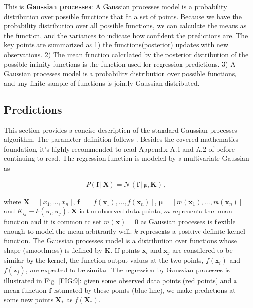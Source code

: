 \documentclass[12pt,letterpaper,fleqn,oneside,titlepage]{offroad-report}
\begin{document}
This is \textbf{Gaussian processes}: A Gaussian processes model is a probability distribution over possible functions that fit a set of points. Because we have the probability distribution over all possible functions, we can calculate the means as the function, and the variances to indicate how confident the predictions are. The key points are summarized as 1) the functions(posterior) updates with new observations. 2) The mean function calculated by the posterior distribution of the possible infinity functions is the function used for regression predictions. 3) A Gaussian processes model is a probability distribution over possible functions, and any finite sample of functions is jointly Gaussian distributed.

\subsection{Predictions}
This section provides a concise description of the standard Gaussian processes algorithm. The parameter definition follows \cite{Rasmussen2006}. Besides the covered mathematics foundation, it's highly recommended to read Appendix A.1 and A.2 of \cite{Rasmussen2006} before continuing to read. The regression function is modeled by a multivariate Gaussian as 
\begin{ceqn}
    \begin{align}
       P(\mathbf{f} \, \lvert\, \mathbf{X}) = \mathcal{N}(\mathbf{f} \, \lvert\, \boldsymbol\mu, \mathbf{K}) \ , \nonumber
    \end{align}
\end{ceqn}
where $\mathbf{X} = [{x}_1,...,{x}_n ]$, $\mathbf{f} = \left[ f(\mathbf{x}_1),...,f(\mathbf{x}_n) \right]$, $\boldsymbol\mu = \left[ m(\mathbf{x}_1),...,m(\mathbf{x}_n) \right]$ and $K_{ij} = k(\mathbf{x}_i,\mathbf{x}_j)$. $\mathbf{X}$ is the observed data points, $m$ represents the mean function and it is common to set $m(\mathbf{x}) = 0$ as Gaussian processes is flexible enough to model the mean arbitrarily well. $k$ represents a positive definite kernel function. The Gaussian processes model is a distribution over functions whose shape (smoothness) is defined by $\mathbf{K}$. If points $\mathbf{x}_i$ and $\mathbf{x}_j$ are considered to be similar by the kernel, the function output values at the two points, $f(\mathbf{x}_i)$ and $f(\mathbf{x}_j)$, are expected to be similar. The regression by Gaussian processes is illustrated in Fig. \ref{FIG:9}: given some observed data points (red points) and a mean function $\mathbf{f}$ estimated by these points (blue line), we make predictions at some new points $\mathbf{X}_*$ as $f(\mathbf{X}_*)$.
\end{document}

